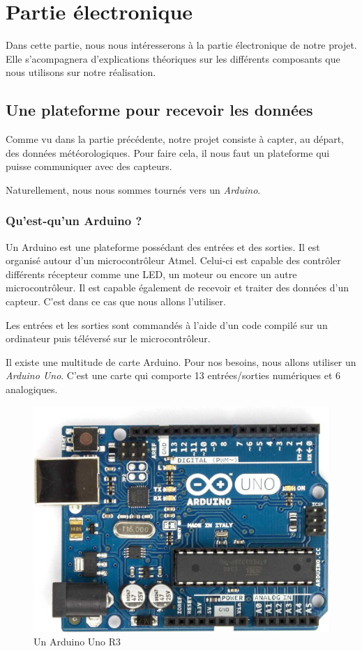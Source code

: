 \chapter{Partie électronique}

Dans cette partie, nous nous intéresserons à la partie électronique de notre projet. Elle s'acompagnera d'explications théoriques sur les différents composants que nous utilisons sur notre réalisation.

\section{Une plateforme pour recevoir les données}

Comme vu dans la partie précédente, notre projet consiste à capter, au départ, des données météorologiques. Pour faire cela, il nous faut un plateforme qui puisse communiquer avec des capteurs.

Naturellement, nous nous sommes tournés vers un \emph{Arduino}.

\subsection{Qu'est-qu'un Arduino ?}

Un Arduino est une plateforme possédant des entrées et des sorties. Il est organisé autour d'un microcontrôleur Atmel. Celui-ci est capable des contrôler différents récepteur comme une LED, un moteur ou encore un autre microcontrôleur. Il est capable également de recevoir et traiter des données d'un capteur. C'est dans ce cas que nous allons l'utiliser.

Les entrées et les sorties sont commandés à l'aide d'un code compilé sur un ordinateur puis téléversé sur le microcontrôleur.

Il existe une multitude de carte Arduino. Pour nos besoins, nous allons utiliser un \emph{Arduino Uno}. C'est une carte qui comporte 13 entrées/sorties numériques et 6 analogiques.

\begin{figure}[!h]
	\centering
	\includegraphics[width=.4\linewidth]{Images/Arduino_Uno}
	\caption{Un Arduino Uno R3}
\end{figure}


